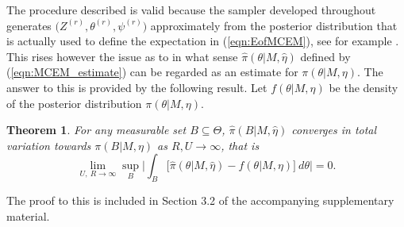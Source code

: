 \documentclass{bioinfo}
\newtheorem{thrm}{Theorem}
\begin{document}
The procedure described is valid because the sampler developed
throughout generates $\big(Z^{(r)}, \theta^{(r)}, \psi^{(r)}\big)$
approximately from the posterior distribution that is actually used to
define the expectation in (\ref{eqn:EofMCEM}), see for example
\cite{FM}. This rises however the issue as to in what sense
$\widehat\pi(\theta|M, \hat\eta)$ defined by (\ref{eqn:MCEM_estimate})
can be regarded as an estimate for $\pi(\theta|M, \eta)$. The answer
to this is provided by the following result. Let $f(\theta|M, \eta)$
be the density of the posterior distribution $\pi(\theta|M, \eta)$.


\begin{thrm} For any measurable set $B\subseteq \Theta$,
 $\widehat\pi(B|M,\hat\eta)$ converges in total variation
towards $\pi(B|M,\eta)$ as $R, U \to \infty$, that is
\[
   \lim_{U,\ R\to\infty}
   \sup_{B}
    \bigg|
     \int_B
     \Big[
       \widehat \pi(\theta|M, \hat\eta) - f(\theta|M,\eta)
     \Big]\ d\theta
    \bigg|
   = 0.
\]
\end{thrm}

The proof to this is included in Section 3.2 of the accompanying 
supplementary material.
\end{document}
